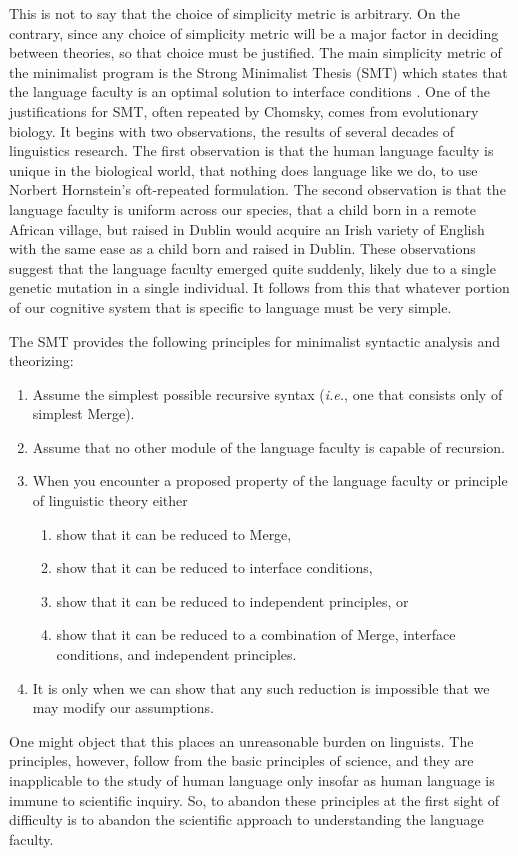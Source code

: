 \documentclass[MilwayThesis]{subfiles}
\begin{document}
This is not to say that the choice of simplicity metric is arbitrary.
On the contrary, since any choice of simplicity metric will be a major factor in deciding between theories, so that choice must be justified.
The main simplicity metric of the minimalist program is the Strong Minimalist Thesis (SMT) which states that the language faculty is an optimal solution to interface conditions \parencite{chomsky2001derivation}.
One of the justifications for SMT, often repeated by Chomsky, comes from evolutionary biology.
It begins with two observations, the results of several decades of linguistics research.
The first observation is that the human language faculty is unique in the biological world, that nothing does language like we do, to use Norbert Hornstein's oft-repeated formulation.
The second observation is that the language faculty is uniform across our species, that a child born in a remote African village, but raised in Dublin would acquire an Irish variety of English with the same ease as a child born and raised in Dublin.
These observations suggest that the language faculty emerged quite suddenly, likely due to a single genetic mutation in a single individual.
It follows from this that whatever portion of our cognitive system that is specific to language must be very simple.

The SMT provides the following principles for minimalist syntactic analysis and theorizing:
\begin{enumerate}[noitemsep]
	\item Assume the simplest possible recursive syntax (\textit{i.e.}, one that consists only of simplest Merge).
	\item Assume that no other module of the language faculty is capable of recursion.
	\item When you encounter a proposed property of the language faculty or principle of linguistic theory either 
		\begin{enumerate}[noitemsep]
			\item show that it can be reduced to Merge,
			\item show that it can be reduced to interface conditions,
			\item show that it can be reduced to independent principles, or
			\item show that it can be reduced to a combination of Merge, interface conditions, and independent principles.
		\end{enumerate}
	\item It is only when we can show that any such reduction is impossible that we may modify our assumptions.	
\end{enumerate}

One might object that this places an unreasonable burden on linguists.
The principles, however, follow from the basic principles of science, and they are inapplicable to the study of human language only insofar as human language is immune to scientific inquiry.
So, to abandon these principles at the first sight of difficulty is to abandon the scientific approach to understanding the language faculty.
\end{document}
